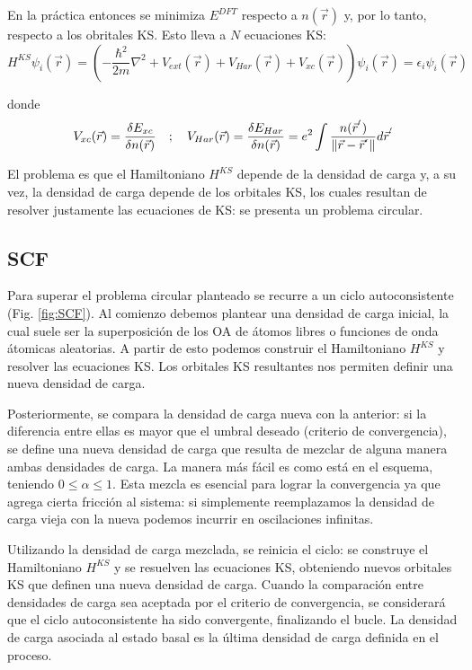   En la práctica entonces se minimiza $E^{DFT}$ respecto a $n(\vec{r})$ y, por lo tanto, respecto a los obritales KS. Esto lleva a $N$ ecuaciones KS:
    $$H^{KS} \psi_i (\vec{r}) = \left( -\frac{\hbar^2}{2m} \nabla^2 + V_{ext} (\vec{r}) + V_{Har} (\vec{r}) + V_{xc} (\vec{r}) \right) \psi_i (\vec{r}) = \epsilon_i \psi_i (\vec{r})$$

  donde
    $$V_{xc} (\vec{r}) = \frac{\delta E_{xc}}{\delta n (\vec{r})} \quad ; \quad V_{Har} (\vec{r}) = \frac{\delta E_{Har}}{\delta n (\vec{r})} = e^2 \int \frac{n(\vec{r}^{'})}{\norm{\vec{r} - \vec{r}^{'}}} d\vec{r}^{'}$$

  El problema es que el Hamiltoniano $H^{KS}$ depende de la densidad de carga y, a su vez, la densidad de carga depende de los orbitales KS, los cuales resultan de resolver justamente las ecuaciones de KS: se presenta un problema circular.

\subsection{SCF}

  Para superar el problema circular planteado se recurre a un ciclo autoconsistente (Fig. \ref{fig:SCF}). Al comienzo debemos plantear una densidad de carga inicial, la cual suele ser la superposición de los OA de átomos libres o funciones de onda átomicas aleatorias. A partir de esto podemos construir el Hamiltoniano $H^{KS}$ y resolver las ecuaciones KS. Los orbitales KS resultantes nos permiten definir una nueva densidad de carga.

  Posteriormente, se compara la densidad de carga nueva con la anterior: si la diferencia entre ellas es mayor que el umbral deseado (criterio de convergencia), se define una nueva densidad de carga que resulta de mezclar de alguna manera ambas densidades de carga. La manera más fácil es como está en el esquema, teniendo $0 \leq \alpha \leq 1$. Esta mezcla es esencial para lograr la convergencia ya que agrega cierta fricción al sistema: si simplemente reemplazamos la densidad de carga vieja con la nueva podemos incurrir en oscilaciones infinitas.


  Utilizando la densidad de carga mezclada, se reinicia el ciclo: se construye el Hamiltoniano $H^{KS}$ y se resuelven las ecuaciones KS, obteniendo nuevos orbitales KS que definen una nueva densidad de carga. Cuando la comparación entre densidades de carga sea aceptada por el criterio de convergencia, se considerará que el ciclo autoconsistente ha sido convergente, finalizando el bucle. La densidad de carga asociada al estado basal es la última densidad de carga definida en el proceso.

